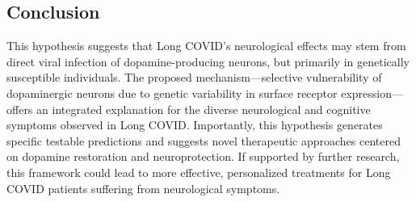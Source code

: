 \documentclass[11pt]{article}
\begin{document}
\begin{center}
\section*{Conclusion}
\end{center}
This hypothesis suggests that Long COVID's neurological effects may stem from direct viral infection of dopamine-producing neurons, but primarily in genetically susceptible individuals. The proposed mechanism—selective vulnerability of dopaminergic neurons due to genetic variability in surface receptor expression—offers an integrated explanation for the diverse neurological and cognitive symptoms observed in Long COVID. Importantly, this hypothesis generates specific testable predictions and suggests novel therapeutic approaches centered on dopamine restoration and neuroprotection. If supported by further research, this framework could lead to more effective, personalized treatments for Long COVID patients suffering from neurological symptoms.

\newpage


\end{document}
